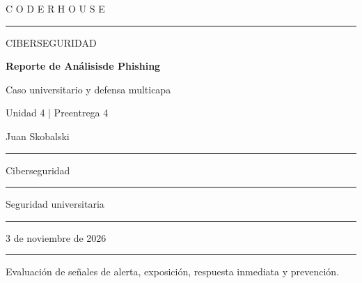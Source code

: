 \documentclass[11pt,a4paper]{article}
\begin{document}
\thispagestyle{empty}
\vspace*{1.0cm}
{\color{turquesa}\large C O D E R H O U S E}\par
\vspace{0.4cm}
{\color{linea}\rule{\textwidth}{1.2pt}}\par
\vspace{2.2cm}
{\color{gris}\Large CIBERSEGURIDAD}\par
\vspace{0.45cm}
{\color{azul}\Huge\bfseries Reporte de Análisis\newline de Phishing}\par
\vspace{0.45cm}
{\color{turquesa}\LARGE Caso universitario y defensa multicapa}\par
\vspace{1.0cm}
{\color{gris}\large Unidad 4 | Preentrega 4}\par

\vfill
\noindent\colorbox{fondo}{%
  \begin{minipage}{\dimexpr\textwidth-2\fboxsep}
    \vspace{0.28cm}
    \noindent{}Juan Skobalski\par
    \vspace{0.18cm}\color{linea}\hrule\color{black}\vspace{0.18cm}
    \noindent{}Ciberseguridad\par
    \vspace{0.18cm}\color{linea}\hrule\color{black}\vspace{0.18cm}
    \noindent{}Seguridad universitaria\par
    \vspace{0.18cm}\color{linea}\hrule\color{black}\vspace{0.18cm}
    \noindent{}3 de noviembre de 2026\par
    \vspace{0.28cm}
  \end{minipage}}
\vspace{0.75cm}
{\color{linea}\rule{\textwidth}{1.2pt}}\par
\vspace{0.25cm}
{\small\color{gris}Evaluación de señales de alerta, exposición, respuesta inmediata y prevención.}
\end{document}
